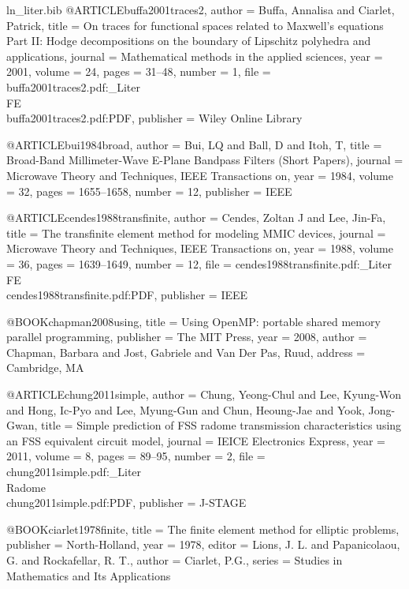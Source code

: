\begin{filecontents*}{ln_liter.bib}
@ARTICLE{buffa2001traces2,
  author = {Buffa, Annalisa and Ciarlet, Patrick},
  title = {On traces for functional spaces related to {M}axwell's equations Part
	II: Hodge decompositions on the boundary of Lipschitz polyhedra and
	applications},
  journal = {Mathematical methods in the applied sciences},
  year = {2001},
  volume = {24},
  pages = {31--48},
  number = {1},
  file = {buffa2001traces2.pdf:_Liter\\FE\\buffa2001traces2.pdf:PDF},
  publisher = {Wiley Online Library}
}

@ARTICLE{bui1984broad,
  author = {Bui, LQ and Ball, D and Itoh, T},
  title = {Broad-Band Millimeter-Wave {E}-Plane Bandpass Filters (Short Papers)},
  journal = {Microwave Theory and Techniques, IEEE Transactions on},
  year = {1984},
  volume = {32},
  pages = {1655--1658},
  number = {12},
  publisher = {IEEE}
}

@ARTICLE{cendes1988transfinite,
  author = {Cendes, Zoltan J and Lee, Jin-Fa},
  title = {The transfinite element method for modeling MMIC devices},
  journal = {Microwave Theory and Techniques, IEEE Transactions on},
  year = {1988},
  volume = {36},
  pages = {1639--1649},
  number = {12},
  file = {cendes1988transfinite.pdf:_Liter\\FE\\cendes1988transfinite.pdf:PDF},
  publisher = {IEEE}
}

@BOOK{chapman2008using,
  title = {Using OpenMP: portable shared memory parallel programming},
  publisher = {The MIT Press},
  year = {2008},
  author = {Chapman, Barbara and Jost, Gabriele and Van Der Pas, Ruud},
  address = {Cambridge, MA}
}

@ARTICLE{chung2011simple,
  author = {Chung, Yeong-Chul and Lee, Kyung-Won and Hong, Ic-Pyo and Lee, Myung-Gun
	and Chun, Heoung-Jae and Yook, Jong-Gwan},
  title = {Simple prediction of FSS radome transmission characteristics using
	an FSS equivalent circuit model},
  journal = {IEICE Electronics Express},
  year = {2011},
  volume = {8},
  pages = {89--95},
  number = {2},
  file = {chung2011simple.pdf:_Liter\\Radome\\chung2011simple.pdf:PDF},
  publisher = {J-STAGE}
}

@BOOK{ciarlet1978finite,
  title = {The finite element method for elliptic problems},
  publisher = {North-Holland},
  year = {1978},
  editor = {Lions, J. L. and Papanicolaou, G. and Rockafellar, R. T.},
  author = {Ciarlet, P.G.},
  series = {Studies in Mathematics and Its Applications}
}


\end{filecontents*}
